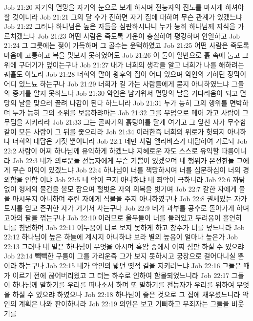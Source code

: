 Job 21:20  자기의 멸망을 자기의 눈으로 보게 하시며 전능자의 진노를 마시게 하셔야 할 것이니라
Job 21:21  그의 달 수가 진하면 자기 집에 대하여 무슨 관계가 있겠느냐
Job 21:22  그러나 하나님은 높은 자들을 심판하시나니 누가 능히 하나님께 지식을 가르치겠느냐
Job 21:23  어떤 사람은 죽도록 기운이 충실하여 평강하며 안일하고
Job 21:24  그 그릇에는 젖이 가득하며 그 골수는 윤택하였고
Job 21:25  어떤 사람은 죽도록 마음에 고통하고 복을 맛보지 못하였어도
Job 21:26  이 둘이 일반으로 흙 속에 눕고 그 위에 구더기가 덮이는구나
Job 21:27  내가 너희의 생각을 알고 너희가 나를 해하려는 궤휼도 아노라
Job 21:28  너희의 말이 왕후의 집이 어디 있으며 악인의 거하던 장막이 어디 있느뇨 하는구나
Job 21:29  너희가 길 가는 사람들에게 묻지 아니하였느냐 그들의 증거를 알지 못하느냐
Job 21:30  악인은 남기워서 멸망의 날을 기다리움이 되고 멸망의 날을 맞으러 끌려 나감이 된다 하느니라
Job 21:31  누가 능히 그의 행위를 면박하며 누가 능히 그의 소위를 보응하랴마는
Job 21:32  그를 무덤으로 메어 가고 사람이 그 무덤을 지키리라
Job 21:33  그는 골짜기의 흙덩이를 달게 여기고 그 앞선 자가 무수함 같이 모든 사람이 그 뒤를 좇으리라
Job 21:34  이러한즉 너희의 위로가 헛되지 아니하냐 너희의 대답은 거짓 뿐이니라
Job 22:1  데만 사람 엘리바스가 대답하여 가로되
Job 22:2  사람이 어찌 하나님께 유익하게 하겠느냐 지혜로운 자도 스스로 유익할 따름이니라
Job 22:3  네가 의로운들 전능자에게 무슨 기쁨이 있겠으며 네 행위가 온전한들 그에게 무슨 이익이 있겠느냐
Job 22:4  하나님이 너를 책망하시며 너를 심문하심이 너의 경외함을 인함 이냐
Job 22:5  네 악이 크지 아니하냐 네 죄악이 극하니라
Job 22:6  까닭없이 형제의 물건을 볼모 잡으며 헐벗은 자의 의복을 벗기며
Job 22:7  갈한 자에게 물을 마시우지 아니하며 주린 자에게 식물을 주지 아니하였구나
Job 22:8  권세있는 자가 토지를 얻고 존귀한 자가 거기서 사는구나
Job 22:9  네가 과부를 공수로 돌아가게 하며 고아의 팔을 꺾는구나
Job 22:10  이러므로 올무들이 너를 둘러있고 두려움이 홀연히 너를 침범하며
Job 22:11  어두움이 너로 보지 못하게 하고 창수가 너를 덮느니라
Job 22:12  하나님이 높은 하늘에 계시지 아니하냐 보라 별의 높음이 얼마나 높은가
Job 22:13  그러나 네 말은 하나님이 무엇을 아시며 흑암 중에서 어찌 심판 하실 수 있으랴
Job 22:14  빽빽한 구름이 그를 가리운즉 그가 보지 못하시고 궁창으로 걸어다니실 뿐이라 하는구나
Job 22:15  네가 악인의 밟던 옛적 길을 지키려느냐
Job 22:16  그들은 때가 이르기 전에 끊어버리웠고 그 터는 하수로 인하여 함몰되었느니라
Job 22:17  그들이 하나님께 말하기를 우리를 떠나소서 하며 또 말하기를 전능자가 우리를 위하여 무엇을 하실 수 있으랴 하였으나
Job 22:18  하나님이 좋은 것으로 그 집에 채우셨느니라 악인의 계획은 나와 판이하니라
Job 22:19  의인은 보고 기뻐하고 무죄자는 그들을 비웃기를

